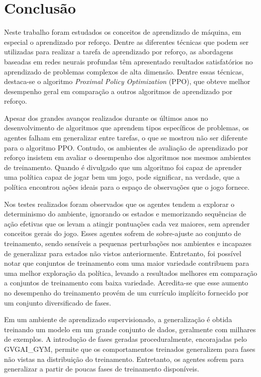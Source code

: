 \chapter{Conclusão}
\label{cap:conclusao}

Neste trabalho foram estudados os conceitos de aprendizado de máquina, em especial o aprendizado por reforço. Dentre as diferentes técnicas que podem ser utilizadas para realizar a tarefa de aprendizado por reforço, as abordagens baseadas em redes neurais profundas têm apresentado resultados satisfatórios no aprendizado de problemas complexos de alta dimensão. Dentre essas técnicas, destaca-se o algoritmo \textit{Proximal Policy Optimization} (PPO), que obteve melhor desempenho geral em comparação a outros algoritmos de aprendizado por reforço.

Apesar dos grandes avanços realizados durante os últimos anos no desenvolvimento de algoritmos que aprendem tipos específicos de problemas, os agentes falham em generalizar entre tarefas, o que se mostrou não ser diferente para o algoritmo PPO. Contudo, os ambientes de avaliação de aprendizado por reforço insistem em avaliar o desempenho dos algoritmos nos mesmos ambientes de treinamento. Quando é divulgado que um algoritmo foi capaz de aprender uma política capaz de jogar bem um jogo, pode significar, na verdade, que a política encontrou ações ideais para o espaço de observações que o jogo fornece. 


Nos testes realizados foram observados que os agentes tendem a explorar o determinismo do ambiente, ignorando os estados e memorizando sequências de ação efetivas que os levam a atingir pontuações cada vez maiores, sem aprender conceitos gerais do jogo. Esses agentes sofrem de sobre-ajuste ao conjunto de treinamento, sendo sensíveis a pequenas perturbações nos ambientes e incapazes de generalizar para estados não vistos anteriormente. Entretanto, foi possível notar que conjuntos de treinamento com uma maior variedade contribuem para uma melhor exploração da política, levando a resultados melhores em comparação a conjuntos de treinamento com baixa variedade. Acredita-se que esse aumento no desempenho do treinamento provém de um currículo implícito fornecido por um conjunto diversificado de fases. 

Em um ambiente de aprendizado supervisionado, a generalização é obtida treinando um modelo em um grande conjunto de dados, geralmente com milhares de exemplos. A introdução de fases geradas proceduralmente, encorajadas pelo GVGAI\_GYM, permite que os comportamentos treinados generalizem para fases não vistas na distribuição do treinamento. Entretanto, os agentes sofrem para generalizar a partir de poucas fases de treinamento disponíveis.


